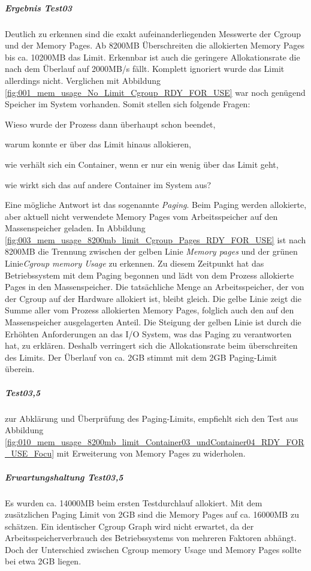 \subparagraph{Ergebnis Test03}
Deutlich zu erkennen sind die exakt aufeinanderliegenden Messwerte der Cgroup und der Memory Pages. Ab 8200MB Überschreiten die allokierten Memory Pages bis ca. 10200MB das Limit. Erkennbar ist auch die geringere Allokationsrate die nach dem Überlauf auf 2000MB/s fällt. Komplett ignoriert wurde das Limit allerdings nicht. Verglichen mit Abbildung \ref{fig:001_mem_usage_No_Limit_Cgroup_RDY_FOR_USE} war noch genügend Speicher im System vorhanden. Somit stellen sich folgende Fragen:

Wieso wurde der Prozess dann überhaupt schon beendet, 

warum konnte er über das Limit hinaus allokieren, 

wie verhält sich ein Container, wenn er nur ein wenig über das Limit geht,

wie wirkt sich das auf andere Container im System aus?

Eine mögliche Antwort ist das sogenannte \emph{Paging}. Beim Paging werden allokierte, aber aktuell nicht verwendete Memory Pages vom Arbeitsspeicher auf den Massenspeicher geladen. In Abbildung \ref{fig:003_mem_usage_8200mb_limit_Cgroup_Pages_RDY_FOR_USE} ist nach 8200MB die Trennung zwischen der gelben Linie \emph{Memory pages} und der grünen Linie\emph{Cgroup memory Usage} zu erkennen. Zu diesem Zeitpunkt hat das Betriebssystem mit dem Paging begonnen und lädt von dem Prozess allokierte Pages in den Massenspeicher. Die tatsächliche Menge an Arbeitsspeicher, der von der Cgroup auf der Hardware allokiert ist, bleibt gleich. Die gelbe Linie zeigt die Summe aller vom Prozess allokierten Memory Pages, folglich auch den auf den Massenspeicher ausgelagerten Anteil. Die Steigung der gelben Linie ist durch die Erhöhten Anforderungen an das I/O System, was das Paging zu verantworten hat, zu erklären. Deshalb verringert sich die Allokationsrate beim überschreiten des Limits. Der Überlauf von ca. 2GB stimmt mit dem 2GB Paging-Limit überein.

\subparagraph{Test03,5}
zur Abklärung und Überprüfung des Paging-Limits, empfiehlt sich den Test aus Abbildung \ref{fig:010_mem_usage_8200mb_limit_Container03_undContainer04_RDY_FOR_USE_Focu} mit Erweiterung von Memory Pages zu widerholen.

\subparagraph{Erwartungshaltung Test03,5}
Es wurden ca. 14000MB beim ersten Testdurchlauf allokiert. Mit dem zusätzlichen Paging Limit von 2GB sind die Memory Pages auf ca. 16000MB zu schätzen. Ein identischer Cgroup Graph wird nicht erwartet, da der Arbeitsspeicherverbrauch des Betriebssystems von mehreren Faktoren abhängt. Doch der Unterschied zwischen Cgroup memory Usage und Memory Pages sollte bei etwa 2GB liegen. 

